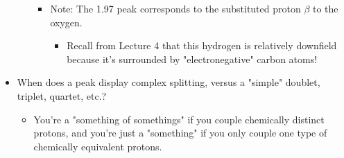 \documentclass[../notes.tex]{subfiles}
\begin{document}
\begin{itemize}
\begin{itemize}
\begin{itemize}
            \item Note: The \SI{1.97}{\partspermillion} peak corresponds to the substituted proton $\beta$ to the oxygen.
            \begin{itemize}
                \item Recall from Lecture 4 that this hydrogen is relatively downfield because it's surrounded by "electronegative" carbon atoms!
            \end{itemize}
        \end{itemize}
    \end{itemize}
    \item When does a peak display complex splitting, versus a "simple" doublet, triplet, quartet, etc.?
    \begin{itemize}
        \item You're a "something of somethings" if you couple chemically distinct protons, and you're just a "something" if you only couple one type of chemically equivalent protons.
    \end{itemize}
\end{itemize}
\end{document}

